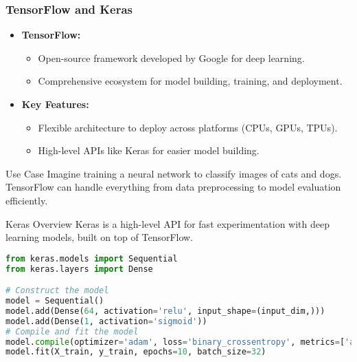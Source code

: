 \documentclass[aspectratio=169]{beamer}
\begin{document}
\begin{frame}[fragile]
  \frametitle{TensorFlow and Keras}
  \begin{itemize}
      \item \textbf{TensorFlow:}
      \begin{itemize}
          \item Open-source framework developed by Google for deep learning.
          \item Comprehensive ecosystem for model building, training, and deployment.
      \end{itemize}
      
      \item \textbf{Key Features:}
      \begin{itemize}
          \item Flexible architecture to deploy across platforms (CPUs, GPUs, TPUs).
          \item High-level APIs like Keras for easier model building.
      \end{itemize}
  \end{itemize}
  
  \begin{block}{Use Case}
  Imagine training a neural network to classify images of cats and dogs. 
  TensorFlow can handle everything from data preprocessing to model evaluation efficiently.
  \end{block}
  
  \begin{block}{Keras Overview}
  Keras is a high-level API for fast experimentation with deep learning models, built on top of TensorFlow.
  \end{block}
  
  \begin{lstlisting}[language=Python]
from keras.models import Sequential
from keras.layers import Dense

# Construct the model
model = Sequential()
model.add(Dense(64, activation='relu', input_shape=(input_dim,)))
model.add(Dense(1, activation='sigmoid'))
# Compile and fit the model
model.compile(optimizer='adam', loss='binary_crossentropy', metrics=['accuracy'])
model.fit(X_train, y_train, epochs=10, batch_size=32)
  \end{lstlisting}
  
\end{frame}
\end{document}
